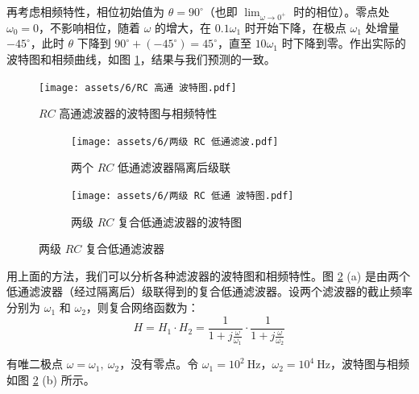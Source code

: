 \documentclass[UTF8]{report}
\def\Hz{\ \mathrm{Hz}}
\theoremstyle{MyLineTheoremStyle} %
\theoremstyle{MyBlockTheoremStyle} %
\theoremstyle{MySubsubsectionStyle} %
\begin{document}
再考虑相频特性，相位初始值为 $\theta = 90^{\circ}$（也即 $\lim_{\omega \to 0^+}$ 时的相位）。零点处 $\omega_0 = 0$，不影响相位，随着 $\omega$ 的增大，在 $0.1 \omega_1$ 时开始下降，在极点 $\omega_1$ 处增量 $-45^{\circ}$，此时 $\theta$ 下降到 $90^\circ + (-45^\circ) = 45^\circ$，直至 $10\omega_1$ 时下降到零。作出实际的波特图和相频曲线，如图 \ref{$RC$ 高通滤波器的波特图}，结果与我们预测的一致。
\begin{figure}[H]\centering
    \texttt{[image: assets/6/RC 高通 波特图.pdf]}
    \caption{$RC$ 高通滤波器的波特图与相频特性}
    \label{$RC$ 高通滤波器的波特图}
\end{figure}


\begin{figure}[H]\centering
\begin{subfigure}[b]{0.55\columnwidth}\centering
    \texttt{[image: assets/6/两级 RC 低通滤波.pdf]}
    \caption{两个 $RC$ 低通滤波器隔离后级联}
\end{subfigure}\hfill
\begin{subfigure}[b]{0.45\columnwidth}\centering
    \texttt{[image: assets/6/两级 RC 低通 波特图.pdf]}
    \caption{两级 $RC$ 复合低通滤波器的波特图}
\end{subfigure}
\caption{两级 $RC$ 复合低通滤波器}
\label{两级 RC 低通滤波器}
\end{figure}
用上面的方法，我们可以分析各种滤波器的波特图和相频特性。图 \ref{两级 RC 低通滤波器} (a) 是由两个低通滤波器（经过隔离后）级联得到的复合低通滤波器。设两个滤波器的截止频率分别为 $\omega_1$ 和 $\omega_2$，则复合网络函数为：
\begin{equation}
H = H_1 \cdot H_2 = \frac{1}{1 + j \frac{\omega}{\omega_1} } \cdot \frac{1}{1 + j \frac{\omega}{\omega_2} }
\end{equation}

有唯二极点 $\omega = \omega_1,\ \omega_2$，没有零点。令 $\omega_1 = 10^2 \Hz$，$\omega_2 = 10^4 \Hz$，波特图与相频如图 \ref{两级 RC 低通滤波器} (b) 所示。
\end{document}

